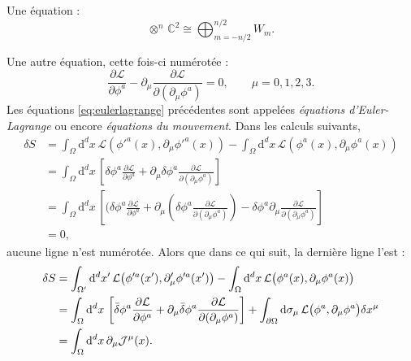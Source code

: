 \documentclass[12pt,twoside,maitrise]{dms}
\theoremstyle{definition}
\numberwithin{equation}{section}
\numberwithin{table}{chapter}
\numberwithin{figure}{chapter}
\begin{document}
Une équation :
\begin{equation*}
	\otimes^n\,\mathbb{C}^2 \cong \bigoplus_{m=-n/2}^{n/2} W_m.
\end{equation*}

Une autre équation, cette fois-ci numérotée :
\begin{equation}
	\label{eq:eulerlagrange}
	\frac{\partial\mathcal{L}}{\partial\phi^a}-\partial_\mu\frac{\partial\mathcal{L}}{\partial(\partial_\mu\phi^a)}=0,\qquad\mu=0,1,2,3.
\end{equation}
Les équations \eqref{eq:eulerlagrange} précédentes sont appelées \emph{équations d'Euler-Lagrange} ou encore \emph{équations du mouvement}. Dans les calculs suivants,
\begin{align*}
	\delta S
	 & = \int_\Omega \mathrm{d}^dx\, \mathcal{L}\left(\phi'^a(x), \partial_\mu\phi'^a(x)\right)
	- \int_\Omega \mathrm{d}^dx\, \mathcal{L}\left(\phi^a(x), \partial_\mu\phi^a(x)\right)          \\
	 & = \int_\Omega \mathrm{d}^dx\, \left[\delta \phi^a \frac{\partial\mathcal{L}}{\partial\phi^a}
	+ \partial_\mu \delta\phi^a \frac{\partial\mathcal{L}}{\partial(\partial_\mu\phi^a)}\right]     \\
	 & = \int_\Omega \mathrm{d}^dx\, \left[(\delta\phi^a \frac{\partial\mathcal{L}}{\partial\phi^a}
		+ \partial_\mu \left(\delta \phi^a \frac{\partial\mathcal{L}}{\partial(\partial_\mu\phi^a)}\right)
	- \delta\phi^a \partial_\mu \frac{\partial\mathcal{L}}{\partial(\partial_\mu\phi^a)}\right]     \\
	 & = 0,
\end{align*}
aucune ligne n'est numérotée. Alors que dans ce qui suit, la derni\`ere ligne l'est :
\begin{align}
	\delta S
	 & = \int_{\Omega'} \mathrm{d}^dx' \,\mathcal{L}\bigl(\phi'^a(x'), \partial'_\mu\phi'^a(x')\bigr)
	- \int_\Omega\mathrm{d}^dx\,\mathcal{L}\bigl(\phi^a(x),\partial_\mu\phi^a(x)\bigr)
	\notag                                                                                               \\
	 & = \int_\Omega \mathrm{d}^dx \,\left[\bar{\delta}\phi^a \frac{\partial\mathcal{L}}{\partial\phi^a}
		+ \partial_\mu \bar{\delta} \phi^a \frac{\partial\mathcal{L}}{\partial(\partial_\mu\phi^a)}\right]
	+ \int_{\partial\Omega}\mathrm{d} \sigma_\mu\,\mathcal{L}
	\bigl(\phi^a,\partial_\mu\phi^a\bigr)\delta x^\mu
	\notag                                                                                               \\
	 & = \int_\Omega\mathrm{d}^dx\,\partial_\mu\mathcal{J}^\mu(x).
	\label{eq:variationaction}
\end{align}
\end{document}
